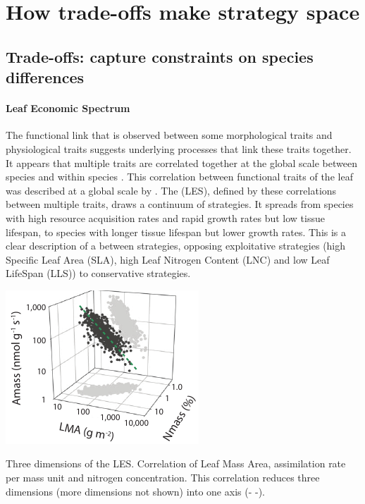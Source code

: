 



\section{How trade-offs make strategy space}

\subsection{Trade-offs: capture constraints on species differences}

\paragraph{Leaf Economic Spectrum}
The functional link that is observed between some morphological traits and physiological traits suggests underlying processes that link these traits together. It appears that multiple traits are correlated together at the global scale between species \parencite{reich_evolution_2003,     wright_worldwide_2004, chave_towards_2009, reich_world-wide_2014} and within species \parencite{hu_novel_2015}. This correlation between functional traits of the leaf was described at a global scale by \cite{wright_worldwide_2004}. The  (LES), defined by these correlations between multiple traits, draws a continuum of strategies. It spreads from species with high resource acquisition rates and rapid growth rates but low tissue lifespan, to species with longer tissue lifespan but lower growth rates. This is a clear description of a  between strategies, opposing exploitative strategies (high Specific Leaf Area (SLA), high Leaf Nitrogen Content (LNC) and low Leaf LifeSpan (LLS)) to conservative strategies.


\begin{marginfigure}
    \includegraphics{./Figures/LES1_m.pdf}
  \caption[Leaf Economic Spectrum]{Three dimensions of the LES. Correlation of Leaf Mass Area, assimilation rate per mass unit and nitrogen concentration. This correlation reduces three dimensions (more dimensions not shown) into one axis (\textcolor{myGreen}{- -}).}
  \label{fg:insurance}
\end{marginfigure}

